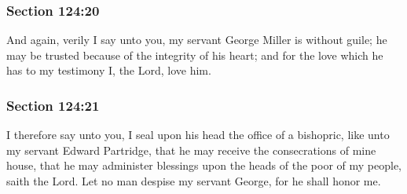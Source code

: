 
	\subsubsection{Section 124:20} %
		\label{DC124-20}

		And again, verily I say unto you, my servant George Miller is without guile; he may be trusted because of the integrity of his heart; and for the love which he has to my testimony I, the Lord, love him.


	\subsubsection{Section 124:21} %
		\label{DC124-21}

		I therefore say unto you, I seal upon his head the office of a bishopric, like unto my servant Edward Partridge, that he may receive the consecrations of mine house, that he may administer blessings upon the heads of the poor of my people, saith the Lord.  Let no man despise my servant George, for he shall honor me.


